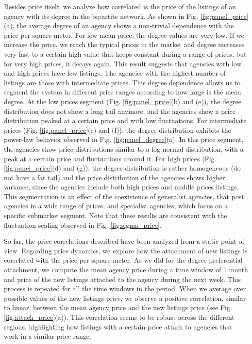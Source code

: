 Besides price itself, we analyze how correlated is the price of the listings of an agency with its degree in the bipartite network. As shown in Fig. \ref{fig:panel_price}(a), the average degree of an agency shows a non-trivial dependence with the price per square meter. For low mean price, the degree values are very low. If we increase the price, we reach the typical prices in the market and degree increases very fast to a certain high value that keeps constant during a range of prices, but for very high prices, it decays again. This result suggests that agencies with low and high prices have few listings. The agencies with the highest number of listings are those with intermediate prices. This degree dependence allows us to segment the system in different price ranges according to how large is the mean degree. At the low prices segment (Fig. \ref{fig:panel_price}(b) and (e)), the degree distribution does not show a long tail anymore, and the agencies show a price distribution peaked at a certain price and with low fluctuations. For intermediate prices (Fig. \ref{fig:panel_price}(c) and  (f)), the degree distribution exhibits the power-law behavior observed in Fig. \ref{fig:panel_degree}(a). In this price segment, the agencies show price distributions similar to a log-normal distribution, with a peak at a certain price and fluctuations around it. For high prices (Fig. \ref{fig:panel_price}(d) and (g)), the degree distribution is rather homogeneous (do not have a fat tail) and the price distribution of the agencies shows higher variance, since the agencies include both high prices and middle prices listings. This segmentation is an effect of the coexistence of generalist agencies, that post agencies in a wide range of prices, and specialist agencies, which focus on a specific submarket segment. Note that these results are consistent with the fluctuation scaling observed in Fig. \ref{fig:sigma_price}. 

So far, the price correlations described have been analyzed from a static point of view. Regarding price dynamics, we explore how the attachment of new listings is correlated with the price per square meter. As we did for the degree preferential attachment, we compute the mean agency price during a time window of 1 month and price of the new listings attached to the agency during the next week. This process is repeated for all the time windows in the period. When we average over possible values of the new listings price, we observe a positive correlation, similar to linear, between the mean agency price and the new listings price (see Fig. \ref{fig:attach_price}(a)). This correlation seems to be robust across the different regions, highlighting how listings with a certain price attach to agencies that work in a similar price range.

